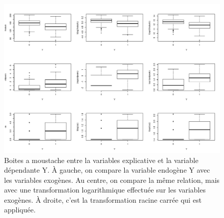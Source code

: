 \documentclass{article}
\begin{document}
	\begin{figure}[H]
		\includegraphics[width=\textwidth]{graphiques/Q2_transformation_2}
		\caption{Boites a moustache entre la variables explicative et la variable dépendante Y.
			À gauche, on compare la variable endogène Y avec les variables exogènes. Au centre, on compare la même relation, mais avec une transformation logarithmique effectuée sur les variables exogènes. À droite, c'est la transformation racine carrée qui est appliquée.}
		\label{Q2_transformations_2}
	\end{figure}
	
	\clearpage
	
		
	
\end{document}
